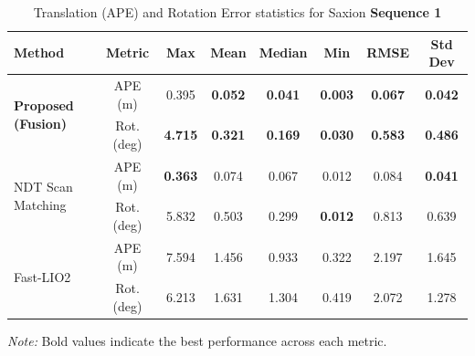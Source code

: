 \begin{table}[H]
	\centering
	\renewcommand{\arraystretch}{0.6}
	\setlength{\tabcolsep}{15pt}
	\caption{Translation (APE) and Rotation Error statistics for Saxion \textbf{Sequence 1} }
	\captionsetup{justification=justified, singlelinecheck=false}
	
	
	\label{tab:ape_rot_saxion_seq1}
	
	\begin{adjustbox}{width=\textwidth}
		\begin{tabular}{@{}lccccccc@{}}
			\toprule
			\textbf{Method} & \textbf{Metric} & \textbf{Max} & \textbf{Mean} & \textbf{Median} & \textbf{Min} & \textbf{RMSE} & \textbf{Std Dev} \\
			\midrule
			
			\multirow{2}{*}{\textbf{Proposed (Fusion)}} 
			& APE (m)        & 0.395   & \textbf{0.052 }   & \textbf{0.041}     & \textbf{0.003 }   &\textbf{ 0.067}   & \textbf{0.042 }\\
			& Rot. (deg)     & \textbf{4.715}   & \textbf{0.321}    & \textbf{0.169}     &\textbf{ 0.030 }   & \textbf{0.583}   &\textbf{ 0.486} \\
			\midrule
			
			\multirow{2}{*}{NDT Scan Matching} 
			& APE (m)        & \textbf{0.363 }  & 0.074    & 0.067     & 0.012    & 0.084   & \textbf{0.041} \\
			& Rot. (deg)     & 5.832   & 0.503    & 0.299     &\textbf{ 0.012}    & 0.813   & 0.639 \\
			\midrule
			
			\multirow{2}{*}{Fast-LIO2} 
			& APE (m)        & 7.594   & 1.456    & 0.933     & 0.322    & 2.197   & 1.645 \\
			& Rot. (deg)     & 6.213   & 1.631    & 1.304     & 0.419    & 2.072   & 1.278 \\
			\bottomrule
		\end{tabular}
	\end{adjustbox}
\vspace{0.5em}
{\footnotesize \textit{Note:} Bold values indicate the best performance across each metric.}
\end{table}

